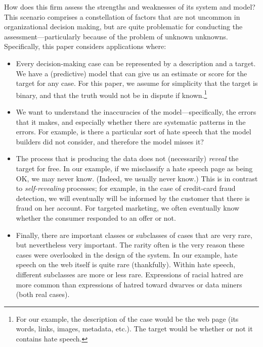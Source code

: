 How does this firm assess the strengths and weaknesses of its system
and model?  This scenario comprises a constellation of factors that
are not uncommon in organizational decision making, but are quite
problematic for conducting the assessment---particularly because of
the problem of unknown unknowns.  Specifically, this paper considers
applications where:

\begin{itemize}
\itemsep=0.0in
\item Every decision-making case can be represented by a description
  and a target.  We have a (predictive) model that can give us an estimate or
  score for the target for any case.  For this paper, we assume for
  simplicity that the target is binary, and that the truth would not
  be in dispute if known.\footnote{For our example, the
  description of the case would be the web page (its words, links,
  images, metadata, etc.).  The target would be whether or not it
  contains hate speech.}

\item We want to understand the inaccuracies of the
  model---specifically, the errors that it makes, and especially
  whether there are systematic patterns in the errors.  For example,
  is there a particular sort of hate speech that the model builders
  did not consider, and therefore the model misses it?

\item The process that is producing the data does not (necessarily)
  \textit{reveal} the target for free.  In our example, if we
  misclassify a hate speech page as being OK, we may never know.
  (Indeed, we usually never know.)  This is in contrast to
  \textit{self-revealing} processes; for example, in the case of credit-card
  fraud detection, we will eventually will be informed by the customer
  that there is fraud on her account.  For targeted marketing, we
  often eventually know whether the consumer responded to an offer or
  not.

\item Finally, there are important classes or subclasses of cases that
  are very rare, but nevertheless very important.  The rarity often is
  the very reason these cases were overlooked in the design of the
  system.  In our example, hate speech on the web itself is quite
  rare (thankfully).  Within hate speech, different subclasses are
  more or less rare.  Expressions of racial hatred are more common
  than expressions of hatred toward dwarves or data miners (both real cases).

\end{itemize}

